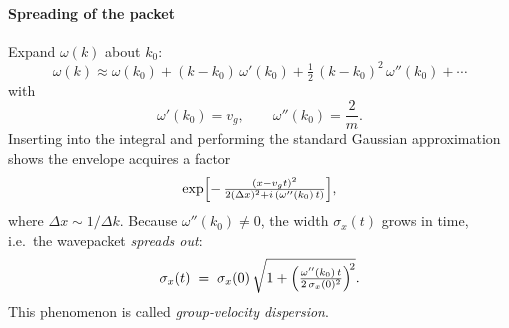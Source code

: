 \documentclass[a4paper,12pt]{report}
\begin{document}
\medskip

\paragraph{Spreading of the packet}
Expand \(\omega(k)\) about \(k_0\):
\[
\omega(k) \approx \omega(k_0)
  + (k-k_0)\,\omega'(k_0)
  + \tfrac12\,(k-k_0)^2\,\omega''(k_0)
  + \cdots
\]
with
\[
\omega'(k_0) = v_g,
\qquad
\omega''(k_0) = \frac{2}{m}.
\]
Inserting into the integral and performing the standard Gaussian approximation shows the envelope acquires a factor
\[
\exp\Bigl[-\,\tfrac{(x - v_g t)^2}{2(\Delta x)^2 + i\,(\omega''(k_0)\,t)}\Bigr],
\]
where \(\Delta x\sim1/\Delta k\).  Because \(\omega''(k_0)\neq0\), the width
\(\sigma_x(t)\) grows in time, i.e.\ the wavepacket \emph{spreads out}:
\[
\sigma_x(t) \;=\;\sigma_x(0)\,\sqrt{1 + \Bigl(\tfrac{\omega''(k_0)\,t}{2\,\sigma_x(0)^2}\Bigr)^{\!2}}.
\]
This phenomenon is called \emph{group‐velocity dispersion}.  
\end{document}
